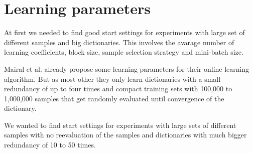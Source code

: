 \section{Learning parameters}
At first we needed to find good start settings for experiments with large set of
different samples and big dictionaries. This involves the
avarage number of learning coefficients, block size, sample selection strategy
and mini-batch size.

Mairal et al. already propose some learning parameters for their online
learning algorithm. But as most other they only learn dictionaries with
a small redundancy of up to four times and compact training sets with 100,000
to 1,000,000 samples that get randomly evaluated until convergence of the
dictionary.

We wanted to find start settings for experiments with large sets of
different samples with no reevaluation of the samples and dictionaries
with much bigger redundancy of 10 to 50 times.


